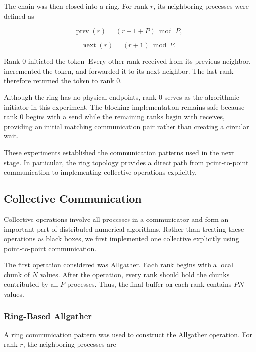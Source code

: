 The chain was then closed into a ring. For rank $r$, its neighboring
processes were defined as

$$
\operatorname{prev}(r)
=
(r-1+P)\bmod P,
$$

$$
\operatorname{next}(r)
=
(r+1)\bmod P.
$$

Rank 0 initiated the token. Every other rank received from its previous
neighbor, incremented the token, and forwarded it to its next neighbor.
The last rank therefore returned the token to rank 0.

Although the ring has no physical endpoints, rank 0 serves as the
algorithmic initiator in this experiment. The blocking implementation
remains safe because rank 0 begins with a send while the remaining ranks
begin with receives, providing an initial matching communication pair
rather than creating a circular wait.

These experiments established the communication patterns used in the
next stage. In particular, the ring topology provides a direct path
from point-to-point communication to implementing collective operations
explicitly.



\subsection{Collective Communication}

Collective operations involve all processes in a communicator and form
an important part of distributed numerical algorithms. Rather than
treating these operations as black boxes, we first implemented one
collective explicitly using point-to-point communication.

The first operation considered was Allgather. Each rank begins with a
local chunk of $N$ values. After the operation, every rank should hold
the chunks contributed by all $P$ processes. Thus, the final buffer on
each rank contains $PN$ values.

\subsubsection{Ring-Based Allgather}

A ring communication pattern was used to construct the Allgather
operation. For rank $r$, the neighboring processes are

